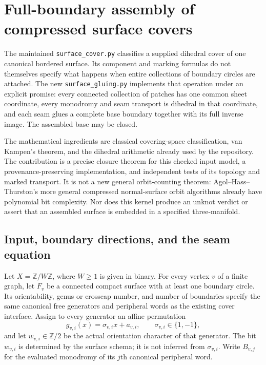 \section{Full-boundary assembly of compressed surface covers}
\label{sec:full-boundary-assembly}

The maintained \texttt{surface\_cover.py} classifies a supplied dihedral
cover of one canonical bordered surface.  Its component and marking formulas
do not themselves specify what happens when entire collections of boundary
circles are attached.  The new \texttt{surface\_gluing.py} implements that
operation under an explicit promise: every connected collection of patches
has one common sheet coordinate, every monodromy and seam transport is
dihedral in that coordinate, and each seam glues a complete base boundary
together with its full inverse image.  The assembled base may be closed.

The mathematical ingredients are classical covering-space classification,
van Kampen's theorem, and the dihedral arithmetic already used by the
repository.  The contribution is a precise closure theorem for this checked
input model, a provenance-preserving implementation, and independent tests of
its topology and marked transport.  It is not a new general orbit-counting
theorem: Agol--Hass--Thurston's more general compressed normal-surface orbit
algorithms already have polynomial bit complexity.  Nor does this kernel
produce an unknot verdict or assert that an assembled surface is embedded in
a specified three-manifold.

\subsection{Input, boundary directions, and the seam equation}

Let $X=\mathbb Z/W\mathbb Z$, where $W\ge1$ is given in binary.  For every
vertex $v$ of a finite graph, let $F_v$ be a connected compact surface with
at least one boundary circle.  Its orientability, genus or crosscap number,
and number of boundaries specify the same canonical free generators and
peripheral words as the existing cover interface.  Assign to every generator
an affine permutation
\[
 g_{v,i}(x)=\sigma_{v,i}x+a_{v,i},\qquad \sigma_{v,i}\in\{1,-1\},
\]
and let $w_{v,i}\in\mathbb Z/2$ be the actual orientation character of that
generator.  The bit $w_{v,i}$ is determined by the surface schema; it is
not inferred from $\sigma_{v,i}$.  Write $B_{v,j}$ for the evaluated
monodromy of its $j$th canonical peripheral word.

